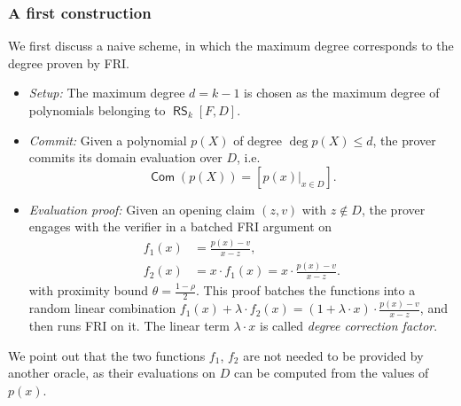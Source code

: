 \documentclass[11pt]{article}
\theoremstyle{definition}
\theoremstyle{remark}
\DeclareMathOperator{\comm}{\mathsf{Com}}
\DeclareMathOperator{\RS}{\mathsf{RS}}
\begin{document}
\subsubsection{A first construction}
\label{s:naivePC}

We first discuss a naive scheme, in which the maximum degree corresponds to the degree proven by FRI.
\begin{itemize}
\item 
\textit{Setup:}
The maximum degree $d=k-1$ is chosen as the maximum degree of polynomials belonging to $\RS_k[F,D]$.

\item
\textit{Commit:} 
Given a polynomial $p(X)$ of degree $\deg p(X)\leq d$, the prover commits its domain evaluation over $D$, i.e. 
\[
\comm(p(X))= [p(x)|_{x\in D}].
\]

\item
\textit{Evaluation proof: }
Given an opening claim $(z,v)$ with $z\notin D$, the prover engages with the verifier in a batched FRI argument on
\begin{align*}
f_1(x) &= \frac{p(x)-v}{x-z},
\\
f_2(x) &=x\cdot f_1(x)= x\cdot \frac{p(x)-v}{x-z}.
\end{align*}
with proximity bound $\theta = \frac{1-\rho}{2}$. 
This proof batches the functions into a random linear combination $f_1(x)+ \lambda\cdot f_2(x) =(1+\lambda \cdot x)\cdot \frac{p(x)-v}{x-z}$, and then runs FRI on it. 
The linear term $\lambda \cdot x$ is called \textit{degree correction factor}.
\end{itemize}

We point out that the two functions $f_1$, $f_2$ are not needed to be provided by another oracle, as their evaluations on $D$ can be computed from the values of $p(x)$.
\end{document}
